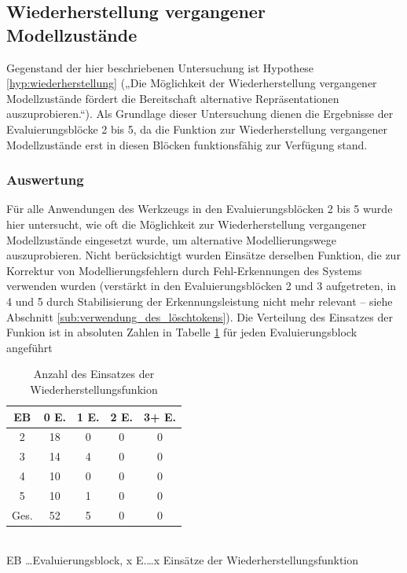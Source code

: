 
\subsection{Wiederherstellung vergangener Modellzustände} %
\label{sub:wiederherstellung_vergangener_modellzustände}

Gegenstand der hier beschriebenen Untersuchung ist Hypothese \ref{hyp:wiederherstellung} („Die Möglichkeit der Wiederherstellung vergangener Modellzustände fördert die Bereitschaft alternative Repräsentationen auszuprobieren.“). Als Grundlage dieser Untersuchung dienen die Ergebnisse der Evaluierungsblöcke 2 bis 5, da die Funktion zur Wiederherstellung vergangener Modellzustände erst in diesen Blöcken funktionsfähig zur Verfügung stand.

\subsubsection{Auswertung} 

Für alle Anwendungen des Werkzeugs in den Evaluierungsblöcken 2 bis 5 wurde hier untersucht, wie oft die Möglichkeit zur Wiederherstellung vergangener Modellzustände eingesetzt wurde, um alternative Modellierungswege auszuprobieren. Nicht berücksichtigt wurden Einsätze derselben Funktion, die zur Korrektur von Modellierungsfehlern durch Fehl-Erkennungen des Systems verwenden wurden (verstärkt in den Evaluierungsblöcken 2 und 3 aufgetreten, in 4 und 5 durch Stabilisierung der Erkennungsleistung nicht mehr relevant -- siehe Abschnitt \ref{sub:verwendung_des_löschtokens}). Die Verteilung des Einsatzes der Funkion ist in absoluten Zahlen in Tabelle \ref{tab:anzahl_wiederherstellung} für jeden Evaluierungsblock angeführt

\begin{table}[htbp]
	\centering
	\caption{Anzahl des Einsatzes der Wiederherstellungsfunkion}
\begin{tabular}{| c || c | c | c | c |}
  \hline
   EB    & 0 E. & 1 E. & 2 E. & 3+ E. \\ \hline
   2     & 18 & 0 & 0 & 0 \\ 
   3     & 14 & 4 & 0 & 0 \\ 
   4     & 10 & 0 & 0 & 0 \\ 
   5     & 10 & 1 & 0 & 0 \\ \hline
   Ges.  & 52 & 5 & 0 & 0 \\ \hline
\end{tabular} \\
\footnotesize EB \ldots Evaluierungsblock, x E.\ldots x Einsätze der Wiederherstellungsfunktion
	\label{tab:anzahl_wiederherstellung}
\end{table}

